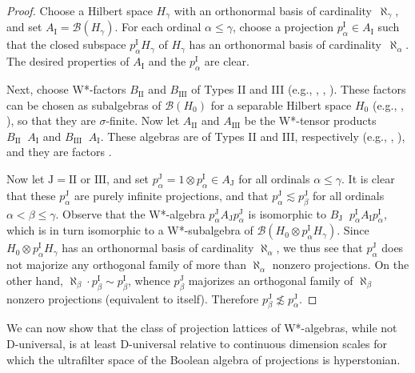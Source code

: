 \documentclass[psamsfonts,reqno]{memo-l}
\theoremstyle{plain}
\theoremstyle{definition}
\theoremstyle{remark}
\numberwithin{equation}{section}
\newcommand{\I}{\mathrm{I}}
\newcommand{\II}{\mathrm{II}}
\newcommand{\III}{\mathrm{III}}
\newcommand{\J}{\mathrm{J}}
\newcommand{\calB}{\mathcal{B}}
\DeclareMathOperator{\barotimes}{\overline\otimes}
\begin{document}
\begin{proof}
Choose a Hilbert space $H_\gamma$ with an
orthonormal basis of cardinality~$\aleph_\gamma$, and set $A_{\I}=
\calB(H_\gamma)$. For each ordinal $\alpha\leq\gamma$, choose a projection
$p^\I_\alpha \in A_\I$ such that the closed subspace $p^\I_\alpha H_\gamma$
of $H_\gamma$ has an orthonormal basis of cardinality~$\aleph_\alpha$.
The desired properties of
$A_{\I}$ and the
$p^{\I}_\alpha$ are clear.

Next, choose W*-factors $B_{\II}$ and $B_{\III}$ of Types II and
III (e.g., \cite[Part I, \S9.4]{Dixbook},
%
\cite[Chapters 6, 8]{KadRing}, \cite[Chapter 4]{Sakai}).
These factors can be chosen as subalgebras of
$\calB(H_0)$ for a separable Hilbert space $H_0$ (e.g.,
\cite[Remark, p.~155]{Dixbook},
\cite[Theorem~7.3.16]{BingRen}), so that they are
$\sigma$-finite\cite[Proposition~1.14.3]{BingRen}. Now let
$A_{\II}$ and $A_{\III}$ be the W*-tensor products
\index{abzzarotimes@$A\barotimes B$|ii}
$B_{\II}\barotimes A_{\I}$ and $B_{\III} \barotimes A_{\I}$. These algebras
are of Types II and III, respectively (e.g.,
\cite[Propositions~11.2.21, 11.2.26]{KadRing},
%
\cite[Proposition~2.6.3, Theorem~2.6.4]{Sakai}), and they are factors
\cite[Proposition~2.6.7]{Sakai}.

Now let $\J=\II$ or $\III$, and set $p^\J_\alpha= 1\otimes p^\I_\alpha \in
A_\J$ for all ordinals $\alpha\leq\gamma$. It is clear that these
$p^\J_\alpha$ are purely infinite projections, and that $p^\J_\alpha
\lesssim p^\J_\beta$ for all ordinals $\alpha<\beta\leq\gamma$. Observe
that the W*-algebra $p^\J_\alpha A_\J p^\J_\alpha$ is
isomorphic to
$B_\J\barotimes p^\I_\alpha A_\I p^\I_\alpha$, which is in turn isomorphic
to a W*-subalgebra of $\calB(H_0\otimes p^\I_\alpha H_\gamma)$. Since
$H_0\otimes p^\I_\alpha H_\gamma$ has an orthonormal basis of cardinality
$\aleph_\alpha$, we thus see that $p^\J_\alpha$ does not majorize any
orthogonal family of more than $\aleph_\alpha$ nonzero projections. On the
other hand, $\aleph_\beta\cdot p^\I_\beta \sim p^\I_\beta$, whence
$p^\J_\beta$ majorizes an orthogonal family of $\aleph_\beta$ nonzero
projections (equivalent to itself). Therefore $p^\J_\beta \not\lesssim
p^\J_\alpha$.
  \end{proof}

We can now show that the class of projection lattices of
W*-algebras, while not D-universal, is
at least D-universal relative to continuous dimension scales for which the ultrafilter space of the
Boolean algebra of projections is
hyperstonian.
\end{document}
